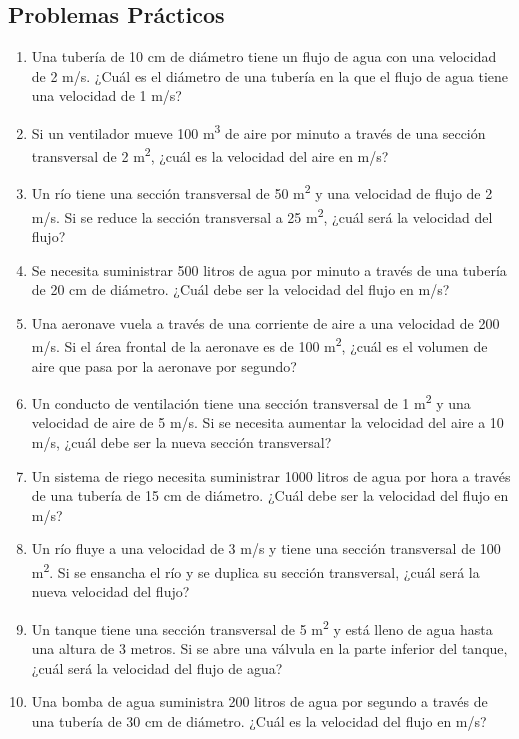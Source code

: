 \documentclass[../main]{subfiles}
\begin{document}
\subsection{Problemas Prácticos}

\begin{enumerate}
    \item Una tubería de 10 cm de diámetro tiene un flujo de agua con una velocidad de 2 m/s. ¿Cuál es el diámetro de una tubería en la que el flujo de agua tiene una velocidad de 1 m/s?
    \item Si un ventilador mueve 100 m\textsuperscript{3} de aire por minuto a través de una sección transversal de 2 m\textsuperscript{2}, ¿cuál es la velocidad del aire en m/s?
    \item Un río tiene una sección transversal de 50 m\textsuperscript{2} y una velocidad de flujo de 2 m/s. Si se reduce la sección transversal a 25 m\textsuperscript{2}, ¿cuál será la velocidad del flujo?
    \item Se necesita suministrar 500 litros de agua por minuto a través de una tubería de 20 cm de diámetro. ¿Cuál debe ser la velocidad del flujo en m/s?
    \item Una aeronave vuela a través de una corriente de aire a una velocidad de 200 m/s. Si el área frontal de la aeronave es de 100 m\textsuperscript{2}, ¿cuál es el volumen de aire que pasa por la aeronave por segundo?
    \item Un conducto de ventilación tiene una sección transversal de 1 m\textsuperscript{2} y una velocidad de aire de 5 m/s. Si se necesita aumentar la velocidad del aire a 10 m/s, ¿cuál debe ser la nueva sección transversal?
    \item Un sistema de riego necesita suministrar 1000 litros de agua por hora a través de una tubería de 15 cm de diámetro. ¿Cuál debe ser la velocidad del flujo en m/s?
    \item Un río fluye a una velocidad de 3 m/s y tiene una sección transversal de 100 m\textsuperscript{2}. Si se ensancha el río y se duplica su sección transversal, ¿cuál será la nueva velocidad del flujo?
    \item Un tanque tiene una sección transversal de 5 m\textsuperscript{2} y está lleno de agua hasta una altura de 3 metros. Si se abre una válvula en la parte inferior del tanque, ¿cuál será la velocidad del flujo de agua?
    \item Una bomba de agua suministra 200 litros de agua por segundo a través de una tubería de 30 cm de diámetro. ¿Cuál es la velocidad del flujo en m/s?
\end{enumerate}
\end{document}
